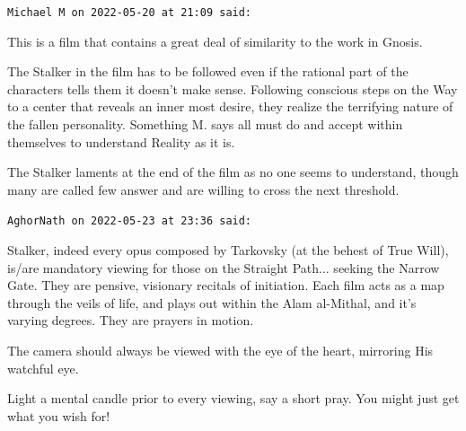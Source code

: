 \begin{footnotesize}
\begin{sffamily}
\texttt{Michael M on 2022-05-20 at 21:09 said:}

This is a film that contains a great deal of similarity to the work in Gnosis.

The Stalker in the film has to be followed even if the rational part of the characters tells them it doesn't make sense. Following conscious steps on the Way to a center that reveals an inner most desire, they realize the terrifying nature of the fallen personality. Something M. says all must do and accept within themselves to understand Reality as it is.

The Stalker laments at the end of the film as no one seems to understand, though many are called few answer and are willing to cross the next threshold.

\hfill

\texttt{AghorNath on 2022-05-23 at 23:36 said:}

Stalker, indeed every opus composed by Tarkovsky (at the behest of True Will), is/are mandatory viewing for those on the Straight Path... seeking the Narrow Gate. They are pensive, visionary recitals of initiation. Each film acts as a map through the veils of life, and plays out within the Alam al-Mithal, and it's varying degrees. They are prayers in motion.

The camera should always be viewed with the eye of the heart, mirroring His watchful eye.

Light a mental candle prior to every viewing, say a short pray. You might just get what you wish for!

\end{sffamily}
\end{footnotesize}

